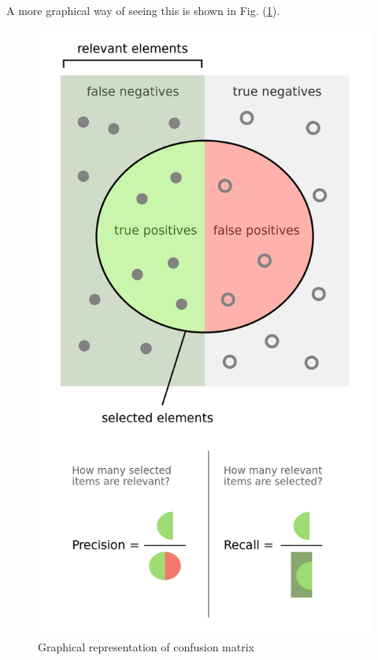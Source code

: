 A more graphical way of seeing this is shown in Fig. (\ref{precisionrecall}).
\begin{figure}[h!]
\begin{center}
	\includegraphics[scale=0.15]{precisionrecall.png}
	\caption[]{Graphical representation of confusion matrix}
	\label{precisionrecall}
	\end{center}
	\end{figure}
	
